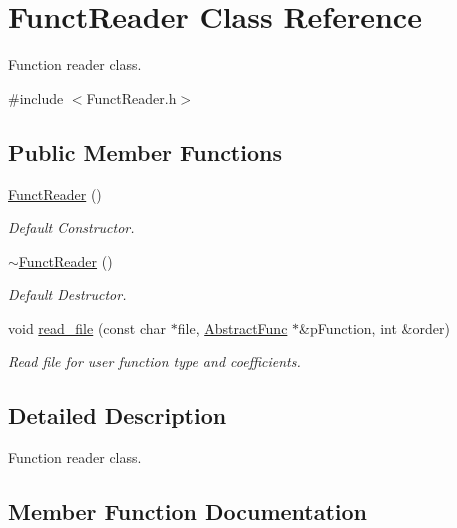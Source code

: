 \hypertarget{classFunctReader}{}\section{Funct\+Reader Class Reference}
\label{classFunctReader}


Function reader class.  




{\ttfamily \#include $<$Funct\+Reader.\+h$>$}

\subsection*{Public Member Functions}
\begin{DoxyCompactItemize}
\item 
\mbox{\label{classFunctReader_ab128a05e403d3ed94f0bd558438b9bf0}} 
\hyperlink{classFunctReader_ab128a05e403d3ed94f0bd558438b9bf0}{Funct\+Reader} ()
\begin{DoxyCompactList}\small\item\em Default Constructor. \end{DoxyCompactList}\item 
\mbox{\label{classFunctReader_ac1c092a6a2536afeef2fcc187eb240aa}} 
\hyperlink{classFunctReader_ac1c092a6a2536afeef2fcc187eb240aa}{$\sim$\+Funct\+Reader} ()
\begin{DoxyCompactList}\small\item\em Default Destructor. \end{DoxyCompactList}\item 
void \hyperlink{classFunctReader_a6951ceadd525807718b17d951c916fae}{read\+\_\+file} (const char $\ast$file, \hyperlink{classAbstractFunc}{Abstract\+Func} $\ast$\&p\+Function, int \&order)
\begin{DoxyCompactList}\small\item\em Read file for user function type and coefficients. \end{DoxyCompactList}\end{DoxyCompactItemize}


\subsection{Detailed Description}
Function reader class. 

\subsection{Member Function Documentation}
\mbox{\label{classFunctReader_a6951ceadd525807718b17d951c916fae}} 
